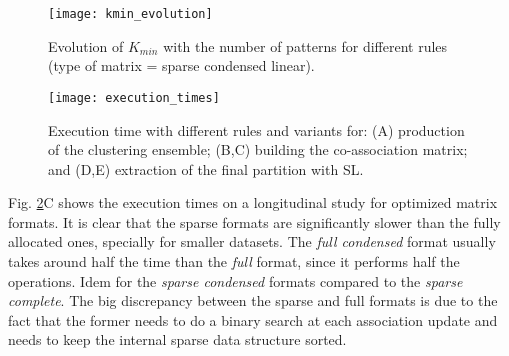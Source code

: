 \begin{figure}[hbt!]
    \centering
    \texttt{[image: kmin\_evolution]}
    \caption{Evolution of $K_{min}$ with the number of patterns for different rules (type of matrix = sparse condensed linear).}
    \label{fig:eac kmin evo}
\end{figure}

\begin{figure}[hbt!]
    \centering
    \texttt{[image: execution\_times]}
    \caption{Execution time with different rules and variants for: (A) production of the clustering ensemble; (B,C) building the co-association matrix; and (D,E) extraction of the final partition with SL.}
    \label{fig:eac execution times}
\end{figure}


Fig. \ref{fig:eac execution times}C shows the execution times on a longitudinal study for optimized matrix formats.
It is clear that the sparse formats are significantly slower than the fully allocated ones, specially for smaller datasets.
The \emph{full condensed} format usually takes around half the time than the \emph{full} format, since it performs half the operations. %
Idem for the \emph{sparse condensed} formats compared to the \emph{sparse complete}.
The big discrepancy between the sparse and full formats is due to the fact that the former needs to do a binary search at each association update and needs to keep the internal sparse data structure sorted.


